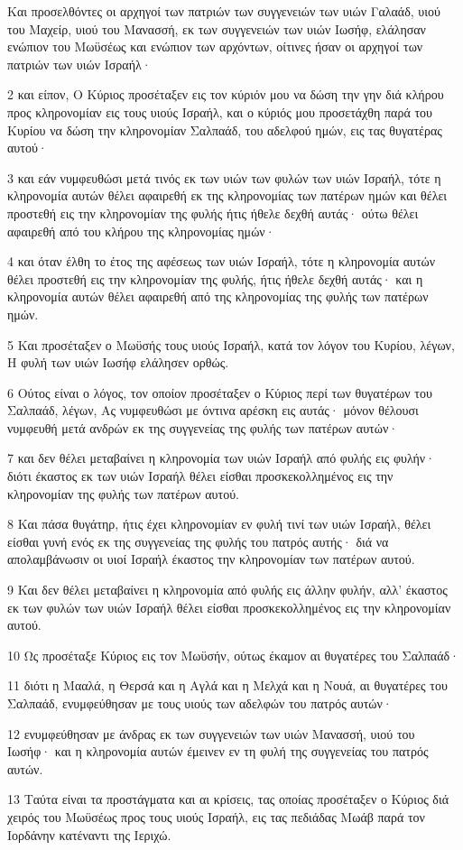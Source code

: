 \par Και προσελθόντες οι αρχηγοί των πατριών των συγγενειών των υιών Γαλαάδ, υιού του Μαχείρ, υιού του Μανασσή, εκ των συγγενειών των υιών Ιωσήφ, ελάλησαν ενώπιον του Μωϋσέως και ενώπιον των αρχόντων, οίτινες ήσαν οι αρχηγοί των πατριών των υιών Ισραήλ·
\par 2 και είπον, Ο Κύριος προσέταξεν εις τον κύριόν μου να δώση την γην διά κλήρου προς κληρονομίαν εις τους υιούς Ισραήλ, και ο κύριός μου προσετάχθη παρά του Κυρίου να δώση την κληρονομίαν Σαλπαάδ, του αδελφού ημών, εις τας θυγατέρας αυτού·
\par 3 και εάν νυμφευθώσι μετά τινός εκ των υιών των φυλών των υιών Ισραήλ, τότε η κληρονομία αυτών θέλει αφαιρεθή εκ της κληρονομίας των πατέρων ημών και θέλει προστεθή εις την κληρονομίαν της φυλής ήτις ήθελε δεχθή αυτάς· ούτω θέλει αφαιρεθή από του κλήρου της κληρονομίας ημών·
\par 4 και όταν έλθη το έτος της αφέσεως των υιών Ισραήλ, τότε η κληρονομία αυτών θέλει προστεθή εις την κληρονομίαν της φυλής, ήτις ήθελε δεχθή αυτάς· και η κληρονομία αυτών θέλει αφαιρεθή από της κληρονομίας της φυλής των πατέρων ημών.
\par 5 Και προσέταξεν ο Μωϋσής τους υιούς Ισραήλ, κατά τον λόγον του Κυρίου, λέγων, Η φυλή των υιών Ιωσήφ ελάλησεν ορθώς.
\par 6 Ούτος είναι ο λόγος, τον οποίον προσέταξεν ο Κύριος περί των θυγατέρων του Σαλπαάδ, λέγων, Ας νυμφευθώσι με όντινα αρέσκη εις αυτάς· μόνον θέλουσι νυμφευθή μετά ανδρών εκ της συγγενείας της φυλής των πατέρων αυτών·
\par 7 και δεν θέλει μεταβαίνει η κληρονομία των υιών Ισραήλ από φυλής εις φυλήν· διότι έκαστος εκ των υιών Ισραήλ θέλει είσθαι προσκεκολλημένος εις την κληρονομίαν της φυλής των πατέρων αυτού.
\par 8 Και πάσα θυγάτηρ, ήτις έχει κληρονομίαν εν φυλή τινί των υιών Ισραήλ, θέλει είσθαι γυνή ενός εκ της συγγενείας της φυλής του πατρός αυτής· διά να απολαμβάνωσιν οι υιοί Ισραήλ έκαστος την κληρονομίαν των πατέρων αυτού.
\par 9 Και δεν θέλει μεταβαίνει η κληρονομία από φυλής εις άλλην φυλήν, αλλ' έκαστος εκ των φυλών των υιών Ισραήλ θέλει είσθαι προσκεκολλημένος εις την κληρονομίαν αυτού.
\par 10 Ως προσέταξε Κύριος εις τον Μωϋσήν, ούτως έκαμον αι θυγατέρες του Σαλπαάδ·
\par 11 διότι η Μααλά, η Θερσά και η Αγλά και η Μελχά και η Νουά, αι θυγατέρες του Σαλπαάδ, ενυμφεύθησαν με τους υιούς των αδελφών του πατρός αυτών·
\par 12 ενυμφεύθησαν με άνδρας εκ των συγγενειών των υιών Μανασσή, υιού του Ιωσήφ· και η κληρονομία αυτών έμεινεν εν τη φυλή της συγγενείας του πατρός αυτών.
\par 13 Ταύτα είναι τα προστάγματα και αι κρίσεις, τας οποίας προσέταξεν ο Κύριος διά χειρός του Μωϋσέως προς τους υιούς Ισραήλ, εις τας πεδιάδας Μωάβ παρά τον Ιορδάνην κατέναντι της Ιεριχώ.


